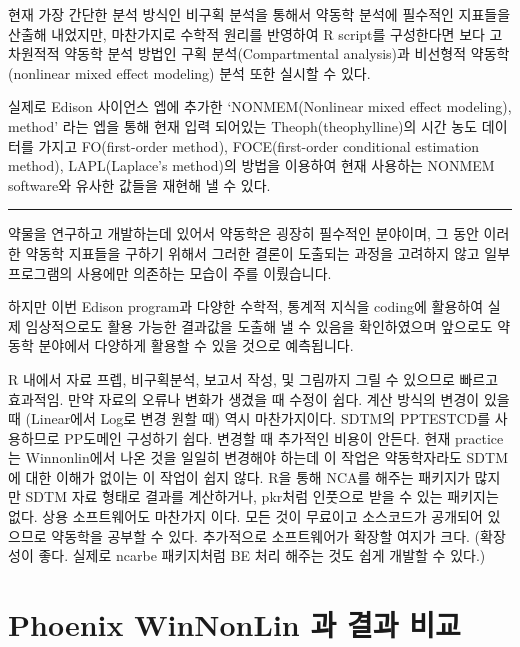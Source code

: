 \documentclass[
  10pt,
]{krantz}
\begin{document}
현재 가장 간단한 분석 방식인 비구획 분석을 통해서 약동학 분석에 필수적인 지표들을 산출해 내었지만, 마찬가지로 수학적 원리를 반영하여 R script를 구성한다면 보다 고차원적적 약동학 분석 방법인 구획 분석(Compartmental analysis)과 비선형적 약동학(nonlinear mixed effect modeling) 분석 또한 실시할 수 있다.

실제로 Edison 사이언스 엡에 추가한 `NONMEM(Nonlinear mixed effect modeling), method' 라는 엡을 통해 현재 입력 되어있는 Theoph(theophylline)의 시간 농도 데이터를 가지고 FO(first-order method), FOCE(first-order conditional estimation method), LAPL(Laplace's method)의 방법을 이용하여 현재 사용하는 NONMEM software와 유사한 값들을 재현해 낼 수 있다.

\begin{center}\rule{0.5\linewidth}{0.5pt}\end{center}

약물을 연구하고 개발하는데 있어서 약동학은 굉장히 필수적인 분야이며, 그 동안 이러한 약동학 지표들을 구하기 위해서 그러한 결론이 도출되는 과정을 고려하지 않고 일부 프로그램의 사용에만 의존하는 모습이 주를 이뤘습니다.

하지만 이번 Edison program과 다양한 수학적, 통계적 지식을 coding에 활용하여 실제 임상적으로도 활용 가능한 결과값을 도출해 낼 수 있음을 확인하였으며 앞으로도 약동학 분야에서 다양하게 활용할 수 있을 것으로 예측됩니다.

R 내에서 자료 프렙, 비구획분석, 보고서 작성, 및 그림까지 그릴 수 있으므로 빠르고 효과적임. 만약 자료의 오류나 변화가 생겼을 때 수정이 쉽다. 계산 방식의 변경이 있을때 (Linear에서 Log로 변경 원할 때) 역시 마찬가지이다.
SDTM의 PPTESTCD를 사용하므로 PP도메인 구성하기 쉽다. 변경할 때 추가적인 비용이 안든다. 현재 practice는 Winnonlin에서 나온 것을 일일히 변경해야 하는데 이 작업은 약동학자라도 SDTM에 대한 이해가 없이는 이 작업이 쉽지 않다. R을 통해 NCA를 해주는 패키지가 많지만 SDTM 자료 형태로 결과를 계산하거나, pkr처럼 인풋으로 받을 수 있는 패키지는 없다. 상용 소프트웨어도 마찬가지 이다.
모든 것이 무료이고 소스코드가 공개되어 있으므로 약동학을 공부할 수 있다. 추가적으로 소프트웨어가 확장할 여지가 크다. (확장성이 좋다. 실제로 ncarbe 패키지처럼 BE 처리 해주는 것도 쉽게 개발할 수 있다.)

\cleardoublepage

\hypertarget{appendix-appendix}{%
\appendix {}}


\hypertarget{wnl-comparison}{%
\chapter{Phoenix WinNonLin 과 결과 비교}\label{wnl-comparison}}
\end{document}
